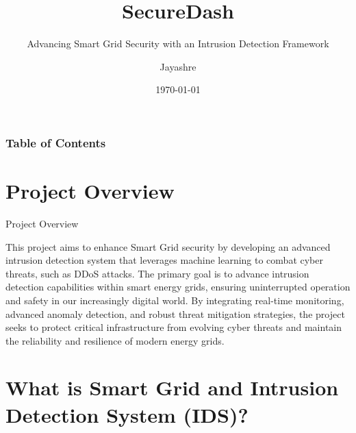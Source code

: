 \documentclass{beamer}
\author[Jayashre]{Jayashre}
\title[SecureDash]{SecureDash}
\subtitle{Advancing Smart Grid Security with an Intrusion Detection Framework}
\institute{Project Overview and Development}
\date{\today}
\begin{document}
\frame{\titlepage}

\begin{frame}
\frametitle{Table of Contents}
\tableofcontents
\end{frame}


\section{Project Overview}
\begin{frame}{Project Overview}
\par This project aims to enhance Smart Grid security by developing an advanced intrusion detection system that leverages machine learning to combat cyber threats, such as DDoS attacks. The primary goal is to advance intrusion detection capabilities within smart energy grids, ensuring uninterrupted operation and safety in our increasingly digital world. By integrating real-time monitoring, advanced anomaly detection, and robust threat mitigation strategies, the project seeks to protect critical infrastructure from evolving cyber threats and maintain the reliability and resilience of modern energy grids.
\end{frame}

\section{What is Smart Grid and Intrusion Detection System (IDS)?}
\end{document}
